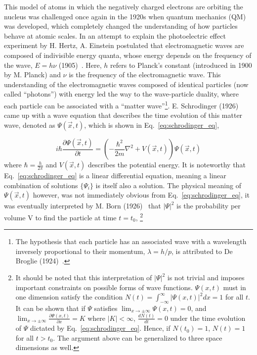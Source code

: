 This model of atoms in which the negatively charged electrons are orbiting the nucleus 
was challenged once again in the 1920s when quantum mechanics (QM) was developed, which completely 
changed the understanding of how particles behave at atomic scales. 
In an attempt to explain the photoelectric effect experiment by H. Hertz,
A. Einstein postulated that electromagnetic waves are composed of indivisible energy quanta, whose energy depends on the
frequency of the wave, $E = h\nu$ (1905)~\cite{Einstein:1905cc}. 
Here, $h$ refers to Planck's constant (introduced in 1900 by M. Planck) and $\nu$
is the frequency of the electromagnetic wave. This understanding of the electromagnetic waves composed of identical 
particles (now called ``photons'') with energy led the way to the wave-particle duality, 
where each particle can be associated with a 
``matter wave''\footnote{The hypothesis that each particle has an associated wave with a wavelength inversely
proportional to their momentum, $\lambda = h / p$, is attributed to De Broglie (1924)~\cite{deBroglie:1924ldk}.}. 
E. Schrodinger (1926)~\cite{Schrodinger:1926gei} 
came up with a wave equation that describes the time evolution of this matter wave, denoted as $\Psi(\vec{x}, t)$, 
which is shown in Eq.~\ref{eq:schrodinger_eq},

\begin{equation}
    i\hbar\frac{\partial \Psi(\vec{x}, t)}{\partial t} = \left(- \frac{\hbar^2}{2m}\nabla^2 + V(\vec{x}, t) \right)\Psi(\vec{x}, t)
    \label{eq:schrodinger_eq}
\end{equation}
where $\hbar = \frac{h}{2\pi}$ and $V(\vec{x}, t)$ describes the potential energy. 
It is noteworthy that Eq.~\ref{eq:schrodinger_eq} is a linear differential equation,
meaning a linear combination of solutions $\{ \Psi_{i} \}$ is itself also a solution.
The physical meaning of $\Psi(\vec{x}, t)$ however,
was not immediately obvious from Eq.~\ref{eq:schrodinger_eq}, it was eventually interpreted by 
M. Born (1926)~\cite{Born:1926uzf}
that $|\Psi|^2$ is the probability per volume V to find the particle at time 
$t=t_{0}$,
\footnote{It should be noted that this interpretation of $|\Psi|^2$ is not trivial and imposes important constraints
on possible forms of wave functions. $\Psi(x,t)$ must in one dimension satisfy the condition 
$N(t) = \int_{-\infty}^{\infty} |\Psi(x,t)|^{2} dx = 1$ for all $t$.
It can be shown that if $\Psi$ satisfies $\lim_{x \rightarrow \pm \infty} \Psi(x,t) = 0$, and
$\lim_{x \rightarrow \pm \infty} \frac{\partial \Psi(x,t)}{\partial x} = K$ where $|K| < \infty$,
$\frac{dN(t)}{dt} = 0$ under the time evolution of $\Psi$ dictated by Eq.~\ref{eq:schrodinger_eq}. 
Hence, if $N(t_0) = 1$, $N(t) = 1$ for all $t > t_0$. The argument above
can be generalized to three space dimensions as well.}

